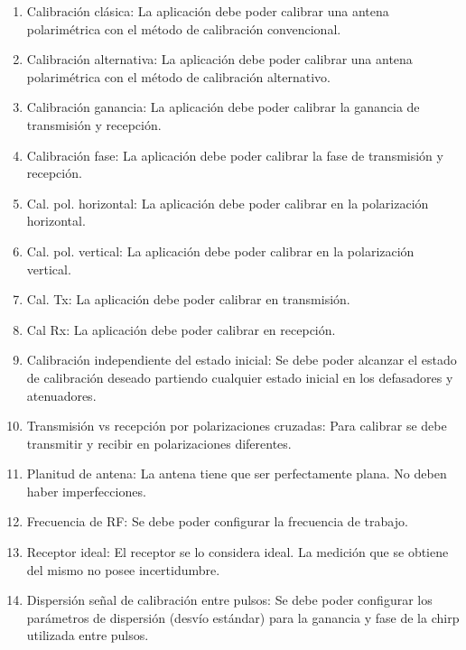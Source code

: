 \begin{enumerate}
    \item Calibración clásica: La aplicación debe poder calibrar una antena polarimétrica con el método de calibración convencional.
    
    \item Calibración alternativa: La aplicación debe poder calibrar una antena polarimétrica con el método de calibración alternativo.
    
    \item Calibración ganancia: La aplicación debe poder calibrar la ganancia de transmisión y recepción.
    
    \item Calibración fase: La aplicación debe poder calibrar la fase de transmisión y recepción.
    
    \item Cal. pol. horizontal: La aplicación debe poder calibrar en la polarización horizontal. 
    \item Cal. pol. vertical: La aplicación debe poder calibrar en la polarización vertical. 
    \item Cal. Tx: La aplicación debe poder calibrar en transmisión. 
    \item Cal Rx: La aplicación debe poder calibrar en recepción. 
    
    \item Calibración independiente del estado inicial: Se debe poder alcanzar el estado de calibración deseado partiendo 
		cualquier estado inicial en los defasadores y atenuadores.
    
    \item Transmisión vs recepción por polarizaciones cruzadas: Para calibrar se debe transmitir y recibir en polarizaciones 
		diferentes.
    
    \item Planitud de antena: La antena tiene que ser perfectamente plana. No deben haber imperfecciones.
           
    \item Frecuencia de RF: Se debe poder configurar la frecuencia de trabajo.
	
	\item Receptor ideal: El receptor se lo considera ideal. La medición que se obtiene del mismo no posee incertidumbre.

    \item Dispersión señal de calibración entre pulsos: Se debe poder configurar los parámetros de dispersión (desvío estándar) para 
		la ganancia y fase de la chirp utilizada entre pulsos.


\end{enumerate}
